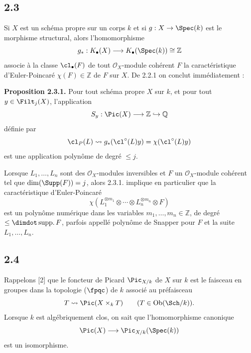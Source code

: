 \subsection*{2.3}
Si $X$ est un schéma propre sur un corps $k$ et si $g:X\to\Spec(k)$ est le morphisme structural, alors l'homomorphisme
\[
g_*:K_\bullet(X)\longrightarrow K_\bullet(\Spec(k))\cong\mathbb Z
\]
associe à la classe $\cl_\bullet(F)$ de tout $\mathcal O_X$-module cohérent $F$ la caractéristique d'Euler-Poincaré $\chi(F)\in\mathbb Z$ de $F$ sur $X$. De 2.2.1 on conclut immédiatement :

\textbf{Proposition 2.3.1.} Pour tout schéma propre $X$ sur $k$, et pour tout $y\in\Filt_j(X)$, l'application
\[
S_y:\Pic(X)\longrightarrow\mathbb Z\hookrightarrow\mathbb Q
\]
définie par
\[
\cl_P(L)\rightsquigarrow g_*(\cl^\circ(L)y)=\chi(\cl^\circ(L)y)
\]
est une application polynôme de degré $\leq j$.

Lorsque $L_1,\ldots,L_n$ sont des $\mathcal O_X$-modules inversibles et $F$ un $\mathcal O_X$-module cohérent tel que $\dim(\Supp(F))=j$, alors 2.3.1. implique en particulier que la caractéristique d'Euler-Poincaré
\begin{equation}\tag{2.3.2}
\chi(L_1^{\otimes m_1}\otimes\cdots\otimes L_n^{\otimes m_n}\otimes F)
\end{equation}
est un polynôme numérique dans les variables $m_1,\ldots,m_n\in\mathbb Z$, de degré $\leq\dimdot\operatorname{supp.}F$, parfois appellé polynôme de Snapper pour $F$ et la suite $L_1,\ldots,L_n$.

\subsection*{2.4}
Rappelons [2] que le foncteur de Picard $\Pic_{X/k}$ de $X$ sur $k$ est le faisceau en groupes dans la topologie ($\fpqc$) de $k$ associé au préfaisceau
\[
T\rightsquigarrow \Pic(X\times_kT)\qquad (T\in\operatorname{Ob}(\Sch/k)).
\]
Lorsque $k$ est algébriquement clos, on sait que l'homomorphisme canonique
\[
\Pic(X)\longrightarrow\Pic_{X/k}(\Spec(k))
\]
est un isomorphisme.